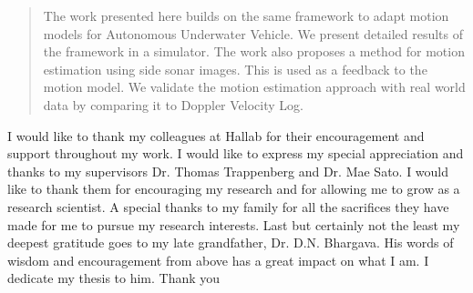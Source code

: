 \documentclass[12pt]{dalcsthesis}
\begin{document}
\begin{abstract}
The work presented here builds on the same framework to adapt motion models for Autonomous Underwater Vehicle. We present detailed results of the framework in a simulator. The work also proposes a method for motion estimation using side sonar images. This is used as a feedback to the motion model. We validate the motion estimation approach with real world data by comparing it to Doppler Velocity Log. 

\end{abstract}

\begin{acknowledgements}
I would like to thank my colleagues at Hallab for their encouragement and support throughout my work. I would like to express my special appreciation and thanks to my supervisors Dr. Thomas Trappenberg and Dr. Mae Sato. I would like to thank them for encouraging my research and for allowing me to grow as a research scientist. A special thanks to my family for all the sacrifices they have made for me to pursue my research interests. Last but certainly not the least my deepest gratitude goes to my late grandfather, Dr. D.N. Bhargava. His words of wisdom and encouragement from above has a great impact on what I am. I dedicate my thesis to him. Thank you   
\end{acknowledgements}
\end{document}
